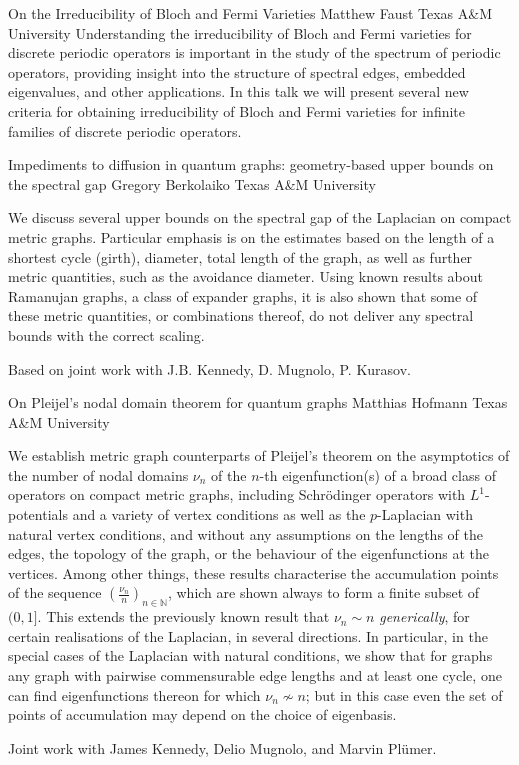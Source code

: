 \vspace{1.5ex}
\abs
{On the Irreducibility of Bloch and Fermi Varieties}
{Matthew Faust}
{Texas A\&M University}
{Understanding the irreducibility of Bloch and Fermi varieties for discrete periodic operators is important in the study of the spectrum of periodic operators, providing insight into the structure of spectral edges, embedded eigenvalues, and other applications.  In this talk we will present several new criteria for obtaining irreducibility of Bloch and Fermi varieties for infinite families of discrete periodic operators.}


\vspace{1.5ex}
\abs
{Impediments to diffusion in quantum graphs: geometry-based upper
bounds on the spectral gap}
{Gregory Berkolaiko}
{Texas A\&M University}
{
We discuss several upper bounds on the spectral gap of the Laplacian
on compact metric graphs. Particular emphasis is on the estimates
based on the length of a shortest cycle (girth), diameter, total
length of the graph, as well as further metric quantities, such as the
avoidance diameter. Using known results about Ramanujan graphs, a
class of expander graphs, it is also shown that some of these metric
quantities, or combinations thereof, do not deliver any spectral
bounds with the correct scaling.

Based on joint work with J.B. Kennedy, D. Mugnolo, P. Kurasov.}


\vspace{1.5ex}
\abs
{On Pleijel's nodal domain theorem for quantum graphs}
{Matthias Hofmann}
{Texas A\&M University}
{
We establish metric graph counterparts of Pleijel's theorem on the asymptotics of the number of nodal domains $\nu_n$ of the $n$-th eigenfunction(s) of a broad class of operators on compact metric graphs, including Schr\"{o}dinger operators with $L^1$-potentials and a variety of vertex conditions as well as the $p$-Laplacian with natural vertex conditions, and without any assumptions on the lengths of the edges, the topology of the graph, or the behaviour of the eigenfunctions at the vertices. {Among other things, these results characterise the accumulation points of the sequence $(\frac{\nu_n}{n})_{n\in\mathbb N}$, which are shown always to form a finite subset of $(0,1]$. This} extends the previously known result that $\nu_n\sim n$ \textit{generically}, for certain realisations of the Laplacian, in several directions. In particular, in the special cases of the Laplacian with natural conditions, we show that for graphs any graph with pairwise commensurable edge lengths and at least one cycle, one can find eigenfunctions thereon for which ${\nu_n}\not\sim {n}$; but in this case even the set of points of accumulation may depend on the choice of eigenbasis.

Joint work with James Kennedy, Delio Mugnolo, and Marvin Plümer.}




